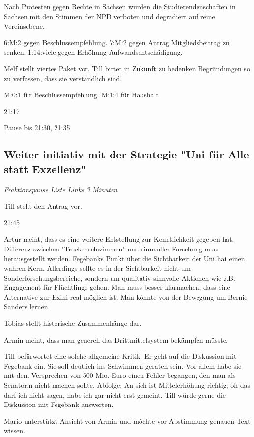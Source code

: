 \documentclass[ngerman,headheight=70pt]{scrartcl}
\begin{document}
    Nach Protesten gegen Rechte in Sachsen wurden die Studierendenschaften
    in Sachsen mit den Stimmen der NPD verboten und degradiert auf reine
    Vereinsebene.

    6:M:2 gegen Beschlussempfehlung.
    7:M:2 gegen Antrag Mitgliedsbeitrag zu senken.
    1:14:viele gegen Erhöhung Aufwandsentschädigung.

    Melf stellt viertes Paket vor. Till bittet in Zukunft zu bedenken Begründungen
    so zu verfassen, dass sie verständlich sind.

    M:0:1 für Beschlussempfehlung.
    M:1:4 für Haushalt

    21:17

    Pause bis 21:30, 21:35

    \subsection{Weiter initiativ mit der Strategie "Uni für Alle statt Exzellenz"}

    \textit{Fraktionspause Liste Links 3 Minuten}

    Till stellt den Antrag vor.

    21:45

    Artur meint, dass es eine weitere Entstellung zur Kenntlichkeit
    gegeben hat.
    Differenz zwischen "Trockenschwimmen" und sinnvoller Forschung muss
    herausgestellt werden. Fegebanks Punkt über die Sichtbarkeit der Uni hat
    einen wahren Kern. Allerdings sollte es in der Sichtbarkeit nicht um
    Sonderforschungsbereiche, sondern um qualitativ sinnvolle Aktionen wie z.B.
    Engagement für Flüchtlinge gehen.
    Man muss besser klarmachen, dass eine Alternative zur Exini real
    möglich ist. Man könnte von der Bewegung um Bernie Sanders lernen.

    Tobias stellt historische Zusammenhänge dar.

    Armin meint, dass man generell das Drittmittelsystem bekämpfen müsste.

    Till befürwortet eine solche allgemeine Kritik. Er geht auf die Diskussion
    mit Fegebank ein. Sie soll deutlich ins Schwimmen geraten sein. Vor allem
    habe sie mit dem Versprechen von 500 Mio. Euro einen Fehler begangen, den
    man als Senatorin nicht machen sollte. Abfolge:
    An sich ist Mittelerhöhung richtig, oh das darf ich nicht sagen, habe ich
    gar nicht erst gemeint.
    Till würde gerne die Diskussion mit Fegebank auswerten.

    Mario unterstützt Ansicht von Armin und möchte vor Abstimmung genauen
    Text wissen.
\end{document}
